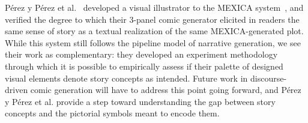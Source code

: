 P\'erez y P\'erez et al.~\cite{perezyperez2012illustrating} developed a 
visual illustrator to the MEXICA system~\cite{perez2001mexica}, and verified
%
the degree to which their 3-panel comic generator 
elicited in readers the same sense of story as a textual realization of 
the same MEXICA-generated plot. 
%
While this system still follows the pipeline model of narrative 
generation, we see their work as complementary: they developed an experiment 
methodology through which it is possible to empirically assess if
their palette of designed visual elements denote story concepts as intended. 
Future work in discourse-driven comic generation will have to address this
point going forward, and P\'erez y P\'erez et al. provide a step
toward understanding the gap between story concepts and the pictorial symbols
meant to encode them. 




